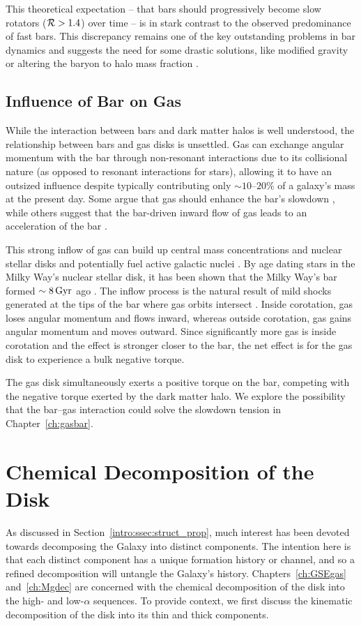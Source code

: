 This theoretical expectation -- that bars should progressively become slow rotators ($\mathcal{R} > 1.4$) over time -- is in stark contrast to the observed predominance of fast bars. This discrepancy remains one of the key outstanding problems in bar dynamics and suggests the need for some drastic solutions, like modified gravity \citep{2021MNRAS.508..926R} or altering the baryon to halo mass fraction \citep{2021A&A...650L..16F}.

\subsection{Influence of Bar on Gas}
While the interaction between bars and dark matter halos is well understood, the relationship between bars and gas disks is unsettled. Gas can exchange angular momentum with the bar through non-resonant interactions due to its collisional nature (as opposed to resonant interactions for stars), allowing it to have an outsized influence despite typically contributing only $\sim10$--$20\%$ of a galaxy's mass at the present day. Some argue that gas should enhance the bar's slowdown \citep{2003MNRAS.341.1179A}, while others suggest that the bar-driven inward flow of gas leads to an acceleration of the bar \citep{2013MNRAS.429.1949A, 2014MNRAS.438L..81A}.

This strong inflow of gas can build up central mass concentrations and nuclear stellar disks \citep{2010ApJ...719.1470V} and potentially fuel active galactic nuclei \citep{1989Natur.338...45S}. By age dating stars in the Milky Way's nuclear stellar disk, it has been shown that the Milky Way's bar formed $\sim8\,\textrm{Gyr}$ ago \citep{2024MNRAS.530.2972S}. The inflow process is the natural result of mild shocks generated at the tips of the bar where gas orbits intersect \citep{1992MNRAS.259..345A,2011MNRAS.415.1027H,2013MNRAS.429.1949A}. Inside corotation, gas loses angular momentum and flows inward, whereas outside corotation, gas gains angular momentum and moves outward. Since significantly more gas is inside corotation and the effect is stronger closer to the bar, the net effect is for the gas disk to experience a bulk negative torque.

The gas disk simultaneously exerts a positive torque on the bar, competing with the negative torque exerted by the dark matter halo. We explore the possibility that the bar--gas interaction could solve the slowdown tension in Chapter~\ref{ch:gasbar}.

\section{Chemical Decomposition of the Disk}
As discussed in Section~\ref{intro:ssec:struct_prop}, much interest has been devoted towards decomposing the Galaxy into distinct components. The intention here is that each distinct component has a unique formation history or channel, and so a refined decomposition will untangle the Galaxy's history. Chapters~\ref{ch:GSEgas} and~\ref{ch:Mgdec} are concerned with the chemical decomposition of the disk into the high- and low-$\alpha$ sequences. To provide context, we first discuss the kinematic decomposition of the disk into its thin and thick components.

